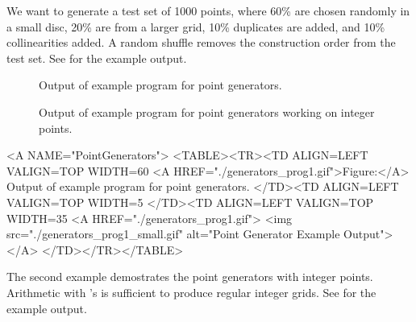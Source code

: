 \ccExample

We want to generate a test set of 1000 points, where 60\% are chosen
randomly in a small disc, 20\% are from a larger grid, 10\% duplicates
are added, and 10\% collinearities added. A random shuffle removes the
construction order from the test set. See  for the example output.


\begin{ccTexOnly}
  \begin{figure}
    \noindent
    \hspace*{0.025\textwidth}%
    \begin{minipage}{0.45\textwidth}%
      \caption{Output of example program for point generators.}
      \label{figurePointGenerator}
    \end{minipage}%
    \hspace*{0.05\textwidth}%
    \begin{minipage}{0.45\textwidth}%
      \caption{Output of example program for point generators working
        on integer points.}
      \label{figureIntegerPointGenerator}
    \end{minipage}%
  \end{figure}
\end{ccTexOnly}

\begin{ccHtmlOnly}
  <A NAME="PointGenerators">
  <TABLE><TR><TD ALIGN=LEFT VALIGN=TOP WIDTH=60%
    <A HREF="./generators_prog1.gif">Figure:</A>
    Output of example program for point generators.
  </TD><TD ALIGN=LEFT VALIGN=TOP WIDTH=5%
  </TD><TD ALIGN=LEFT VALIGN=TOP WIDTH=35%
    <A HREF="./generators_prog1.gif">
        <img src="./generators_prog1_small.gif" 
             alt="Point Generator Example Output"></A>
  </TD></TR></TABLE>
\end{ccHtmlOnly}


The second example demostrates the point generators with integer
points. Arithmetic with 's is sufficient to produce
regular integer grids. See 
for the example output.

